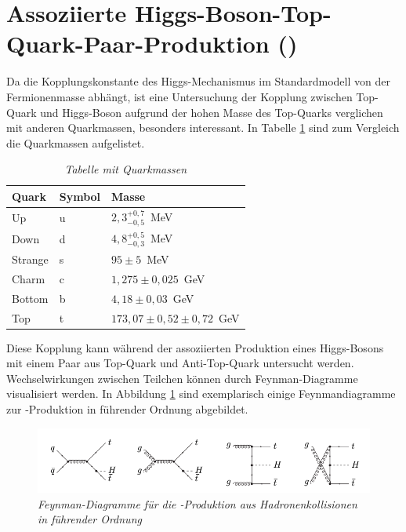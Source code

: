 \section{Assoziierte Higgs-Boson-Top-Quark-Paar-Produktion (\ttH)}
\label{ch:Theorie:sec:ttH}

Da die Kopplungskonstante des Higgs-Mechanismus im Standardmodell von der Fermionenmasse abh\"angt, ist eine Untersuchung der Kopplung zwischen Top-Quark und Higgs-Boson aufgrund der hohen Masse des Top-Quarks verglichen mit anderen Quarkmassen, besonders interessant. In Tabelle \ref{tab:quarkmasse} sind zum Vergleich die Quarkmassen aufgelistet.\\


\begin{table}[hhh]\parbox{12cm}{
  \caption[Quarkmassen]{\it Tabelle mit Quarkmassen {\rm \cite{Agashe:2014kda}}
  }\label{tab:quarkmasse}}
  \begin{center}
  \begin{tabular}{lll}
  \hline
  {\bf Quark} & {\bf Symbol} & {\bf Masse}  \\
  \hline \hline
     Up		& u & $2,3^{+0,7}_{-0,5}$~MeV \\
     Down	& d & $4,8^{+0,5}_{-0,3}$~MeV \\
     Strange& s & $95\pm 5$~MeV \\
     Charm	& c & $1,275\pm 0,025$~GeV \\ 
  	 Bottom & b & $4,18\pm 0,03$~GeV \\
     Top    & t & $ 173,07\pm 0,52\pm 0,72$~GeV \\                                   
  \hline
  \end{tabular}
  \end{center}
\end{table}

Diese Kopplung kann w\"ahrend der assoziierten Produktion eines Higgs-Bosons mit einem Paar aus Top-Quark und Anti-Top-Quark untersucht werden.\\
Wechselwirkungen zwischen Teilchen k\"onnen durch Feynman-Diagramme visualisiert werden. In Abbildung \ref{fig:ttH_feynmans} sind exemplarisch einige Feynmandiagramme zur \ttH-Produktion in f\"uhrender Ordnung abgebildet.

\begin{figure}[hhh]
 \begin{center}
   \includegraphics[width=\textwidth]{graphics/ttH_feynmans.png}
   \parbox[b]{12cm}{
     \caption[\ttH Feynman-Diagramme]
             {\label{fig:ttH_feynmans} \it Feynman-Diagramme f\"ur die \ttH-Produktion aus Hadronenkollisionen in f\"uhrender Ordnung \cite{hep-ph/0211352}}
   }
 \end{center}
\end{figure}